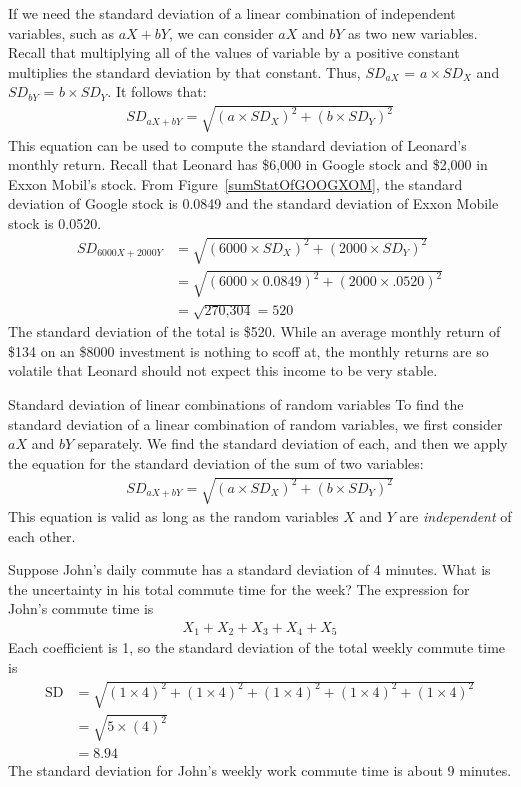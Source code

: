 If we need the standard deviation of a linear combination of independent variables, such as $aX + bY$, we can consider $aX$ and $bY$ as two new variables. Recall that multiplying all of the values of variable by a positive constant multiplies the standard deviation by that constant. Thus, $SD_{aX}$ =  $a \times SD_X$ and $SD_{bY}$ =  $b \times SD_Y$. It follows that:
\begin{align*}
SD_{aX + bY} = \sqrt{(a \times SD_X)^2 + (b \times SD_Y)^2}
\end{align*}
This equation can be used to compute the standard deviation of Leonard's monthly return. Recall that Leonard has \$6,000 in Google stock and \$2,000 in Exxon Mobil's stock. From Figure~\ref{sumStatOfGOOGXOM}, the standard deviation of Google stock is 0.0849 and the standard deviation of Exxon Mobile stock is 0.0520.
\begin{align*}
SD_{6000X + 2000Y}
	&= \sqrt{(6000\times SD_X)^2 + (2000\times SD_Y)^2} \\
	&= \sqrt{(6000\times 0.0849)^2 + (2000\times .0520)^2} \\
	&= \sqrt{\text{270,304}} = 520
\end{align*}
The standard deviation of the total is \$520. While an average monthly return of \$134 on an \$8000 investment is nothing to scoff at, the monthly returns are so volatile that Leonard should not expect this income to be very stable.

\begin{onebox}{Standard deviation of linear combinations of random variables}
To find the standard deviation of a linear combination of random variables, we first consider $aX$ and $bY$ separately. We find the standard deviation of each, and then we apply the equation for the standard deviation of the sum of two variables:
\begin{align*}
SD_{aX + bY} = \sqrt{(a\times SD_X)^2 + (b\times SD_Y)^2}
\end{align*}
This equation is valid as long as the random variables $X$ and $Y$ are \emph{independent} of each other.\end{onebox}

\begin{examplewrap}
\begin{nexample}{Suppose John's daily commute has a standard deviation of 4 minutes. What is the uncertainty in his total commute time for the week?} \label{sdOfJohnsCommuteWeeklyTime}
The expression for John's commute time is
\begin{align*}
X_1 + X_2 + X_3 + X_4 + X_5
\end{align*}
Each coefficient is 1, so the standard deviation of the total weekly commute time is
\begin{align*}
\text{SD}&= \sqrt{(1 \times 4)^2 + (1 \times 4)^2 + (1 \times 4)^2 + (1 \times 4)^2 + (1 \times 4)^2} \\
&= \sqrt{5\times (4)^2} \\
&= 8.94
\end{align*}
The standard deviation for John's weekly work commute time is about 9 minutes.
\end{nexample}
\end{examplewrap}

